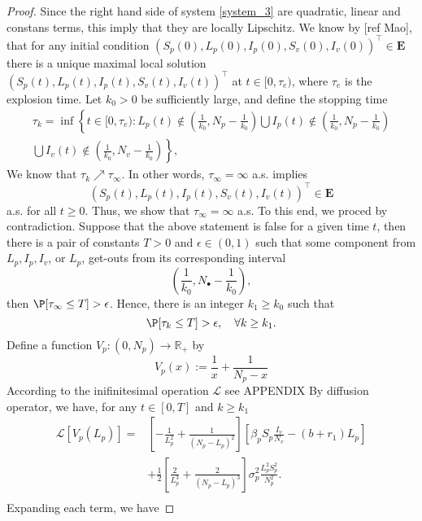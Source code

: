 \begin{proof}
		Since the right hand side of system \eqref{system_3} are quadratic, 
	linear and constans terms, this imply that they are locally Lipschitz. We 
	know by [ref Mao], that for any initial condition
	$
		(S_p(0), L_p(0), I_p(0), S_v (0), I_v(0))^{\top}\in \mathbf{E}
	$ 
	there is a unique maximal local solution 
	$(S_p(t), L_p(t), I_p(t), S_v(t), I_v(t))^{\top}$ 
	at $t\in [0,\tau_e)$, where 
	$\tau_e$ is the explosion time. Let $k_0>0$ be sufficiently large, and 
	define the stopping time
	\begin{multline}
		\label{eqn:invariatn_set}
		\tau_k = %
			\inf
			\left\{
				t \in [0,\tau_e)
				: 
				L_p(t) \notin 
					\left(
						\frac{1}{k_0},
					 N_p - \frac{1}{k_0}
					\right)		
			 \bigcup 
				I_p(t)
				\notin
				\left(
					\frac{1}{k_0}, 
					N_p-\frac{1}{k_0}
				\right)
			\right.
			\\
			\bigcup
			\left.		
					I_v(t) 
					\notin
					\left(
						\frac{1}{k_0},
						N_v - \frac{1}{k_0}
					\right)
			\right\},
		\end{multline}
%	
	We know that $\tau_k \nearrow \tau_\infty$. 
	In other words, $\tau_\infty = \infty$ a.s. 
	implies
	\begin{equation}
		\label{eqn:invariance_prop}
		(
			S_p(t),
			L_p(t),
			I_p(t),
			S_v(t),
			I_v(t)
		)^{\top}\in \mathbf{E}
	\end{equation}
	 a.s. for all $t\geq 0$. Thus, 
	we  show that $\tau_\infty=\infty$ a.s. To this end,  we proced
	by contradiction. Suppose that the above statement is false for a given time $t$, then there is 
	a pair of constants $T>0$ and $\epsilon  \in (0,1)$  such that some component from $L_p,I_p,I_v$, or $L_p$, get-outs from its corresponding 
	interval
	$$
	\left(
		\frac{1}{k_0}, 
	N_{\bullet} - \frac{1}{k_0}
	\right), 
	$$
	then %
	$
		\P[\tau_\infty\leq T]>\epsilon 
	$. 
	Hence, there is an integer $k_1\geq k_0$ such that
%	
	\begin{equation}\label{Positive1}
		\P[\tau_k\leq T]>\epsilon,
		\quad \forall k\geq k_1.
	\end{equation}
	Define a function $V_p:(0,N_p)\rightarrow \mathbb{R}_+$ by
%	
	\begin{equation*}
		V_p(x) := 
			\frac{1}{x} + 
			\frac{1}{N_p-x}
	\end{equation*}
%	
	According to the inifinitesimal operation $\mathcal{L}$
	see APPENDIX
	By diffusion operator, we have, for any $t\in [0,T]$ and $k\geq k_1$ 
%
	\begin{align*}
		\mathcal{L}[V_p(L_p)] 
			=&	
				\left[
					-\frac{1}{L_p^2} + 
					\frac{1}{(N_p - L_p) ^ 2}
				\right]
				\left[
					\beta_p S_p 
					\frac{I_v}{N_v} - 
					(b + r_1) L_p\right]
				\\
			&+
				\frac{1}{2}
				\left[
					\frac{2}{L_p^3} + 
					\frac{2}{(N_p - L_p)^3}
				\right]
				\sigma_p ^ 2
				\frac{L_p^2 S_p^2}{N_p^2}.
			\\
	\end{align*}
%	
	Expanding each term, we have
	

\end{proof}
